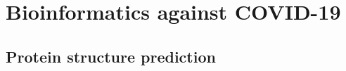 \documentclass[10pt]{beamer}
\newcommand{\1}{
        	\setbeamertemplate{background}{
        		\texttt{[image: img/1]}
        		\tikz[overlay] \fill[fill opacity=0.75,fill=white] (0,0) rectangle (-\paperwidth,\paperheight);
        	}
}
\begin{document}
\section{Bioinformatics against COVID-19}





\subsection{Protein structure prediction}
\end{document}
